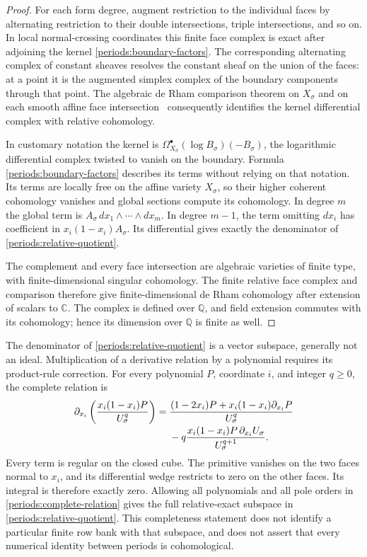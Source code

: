 \begin{proof}
For each form degree, augment restriction to the individual faces by
alternating restriction to their double intersections, triple intersections,
and so on.  In local normal-crossing coordinates this finite face complex
is exact after adjoining the kernel
\eqref{periods:boundary-factors}.  The corresponding alternating complex
of constant sheaves resolves the constant sheaf on the union of the
faces: at a point it is the augmented simplex complex of the boundary
components through that point.  The algebraic de Rham comparison theorem
on $X_\sigma$ and on each smooth affine face
intersection~\cite[Theorem~1]{grothendieck1966} consequently identifies
the kernel differential complex with relative cohomology.

In customary notation the kernel is
$\Omega_{X_\sigma}^{\bullet}(\log B_\sigma)(-B_\sigma)$, the logarithmic
differential complex twisted to vanish on the boundary.  Formula
\eqref{periods:boundary-factors} describes its terms without relying on
that notation.  Its terms are locally free on the affine variety
$X_\sigma$, so their higher coherent cohomology vanishes and global
sections compute its cohomology.  In degree $m$ the global term is
$A_\sigma\,dx_1\wedge\cdots\wedge dx_m$.  In degree $m-1$, the term
omitting $dx_i$ has coefficient in $x_i(1-x_i)A_\sigma$.  Its differential
gives exactly the denominator of \eqref{periods:relative-quotient}.

The complement and every face intersection are algebraic varieties of
finite type, with finite-dimensional singular cohomology.  The finite
relative face complex and comparison therefore give finite-dimensional
de Rham cohomology after extension of scalars to $\mathbb C$.  The
complex is defined over $\mathbb Q$, and field extension commutes with
its cohomology; hence its dimension over $\mathbb Q$ is finite as well.
\end{proof}

The denominator of \eqref{periods:relative-quotient} is a vector
subspace, generally not an ideal.  Multiplication of a derivative relation
by a polynomial requires its product-rule correction.  For every
polynomial $P$, coordinate $i$, and integer $q\ge0$, the complete
relation is
\begin{align}
 \partial_{x_i}\left(\frac{x_i(1-x_i)P}{U_\sigma^q}\right)
 ={}&\frac{(1-2x_i)P+x_i(1-x_i)\partial_{x_i}P}{U_\sigma^q}
 \notag\\[-2pt]
 &-q\frac{x_i(1-x_i)P\,\partial_{x_i}U_\sigma}{U_\sigma^{q+1}}.
 \label{periods:complete-relation}
\end{align}
Every term is regular on the closed cube.  The primitive vanishes on the
two faces normal to $x_i$, and its differential wedge restricts to zero
on the other faces.  Its integral is therefore exactly zero.  Allowing
all polynomials and all pole orders in
\eqref{periods:complete-relation} gives the full relative-exact subspace
in \eqref{periods:relative-quotient}.  This completeness statement does
not identify a particular finite row bank with that subspace, and does
not assert that every numerical identity between periods is cohomological.


